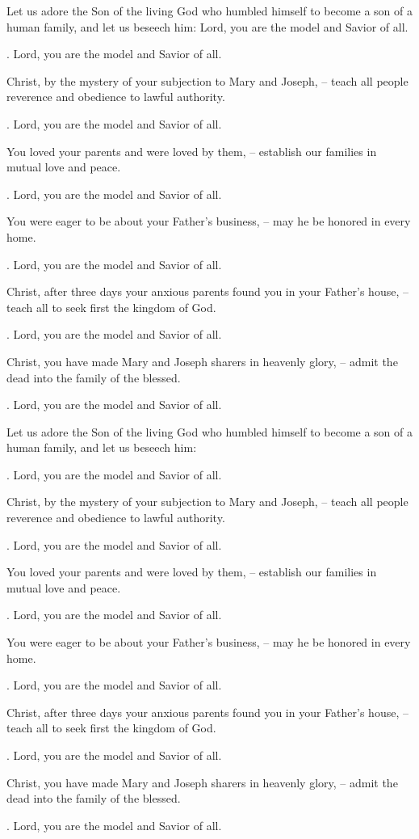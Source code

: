 \lettrine[loversize=0.15,lines=2]{L}{}et us adore the Son of the living God who humbled himself to become a son of a human family, and let us beseech him:
Lord, you are the model and Savior of all.
\par \Rbar. Lord, you are the model and Savior of all.

Christ, by the mystery of your subjection to Mary and Joseph,
– teach all people reverence and obedience to lawful authority.
\par \Rbar. Lord, you are the model and Savior of all.

You loved your parents and were loved by them,
– establish our families in mutual love and peace.
\par \Rbar. Lord, you are the model and Savior of all.

You were eager to be about your Father’s business,
– may he be honored in every home.
\par \Rbar. Lord, you are the model and Savior of all.

Christ, after three days your anxious parents found you in your Father’s house,
– teach all to seek first the kingdom of God.
\par \Rbar. Lord, you are the model and Savior of all.

Christ, you have made Mary and Joseph sharers in heavenly glory,
– admit the dead into the family of the blessed.
\par \Rbar. Lord, you are the model and Savior of all.

Let us adore the Son of the living God who humbled himself to become a son of a human family, and let us beseech him:
\par \Rbar. Lord, you are the model and Savior of all.

Christ, by the mystery of your subjection to Mary and Joseph,
– teach all people reverence and obedience to lawful authority.
\par \Rbar. Lord, you are the model and Savior of all.

You loved your parents and were loved by them,
– establish our families in mutual love and peace.
\par \Rbar. Lord, you are the model and Savior of all.

You were eager to be about your Father’s business,
– may he be honored in every home.
\par \Rbar. Lord, you are the model and Savior of all.

Christ, after three days your anxious parents found you in your Father’s house,
– teach all to seek first the kingdom of God.
\par \Rbar. Lord, you are the model and Savior of all.

Christ, you have made Mary and Joseph sharers in heavenly glory,
– admit the dead into the family of the blessed.
\par \Rbar. Lord, you are the model and Savior of all.